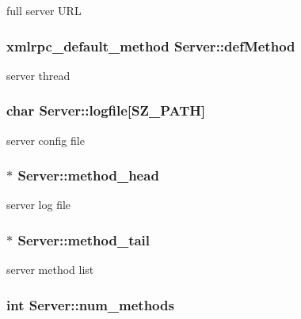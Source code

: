 full server URL \hypertarget{structServer_bafe10e20203238b2f957419066955be}{
\subsubsection[{defMethod}]{\setlength{\rightskip}{0pt plus 5cm}xmlrpc\_\-default\_\-method {\bf Server::defMethod}}}
\label{structServer_bafe10e20203238b2f957419066955be}


server thread \hypertarget{structServer_520e88309f2f48106caa1fb6bacd9b3b}{
\subsubsection[{logfile}]{\setlength{\rightskip}{0pt plus 5cm}char {\bf Server::logfile}\mbox{[}SZ\_\-PATH\mbox{]}}}
\label{structServer_520e88309f2f48106caa1fb6bacd9b3b}


server config file \hypertarget{structServer_0d3f35225f9d2bcb9350016948e77ada}{
\subsubsection[{method\_\-head}]{$\ast$ {\bf Server::method\_\-head}}}
\label{structServer_0d3f35225f9d2bcb9350016948e77ada}


server log file \hypertarget{structServer_baf5367f677cc45e2b46d08989a068e4}{
\subsubsection[{method\_\-tail}]{$\ast$ {\bf Server::method\_\-tail}}}
\label{structServer_baf5367f677cc45e2b46d08989a068e4}


server method list \hypertarget{structServer_fd95ab28088415ee5900bd6bf70dc0a2}{
\subsubsection[{num\_\-methods}]{\setlength{\rightskip}{0pt plus 5cm}int {\bf Server::num\_\-methods}}}
\label{structServer_fd95ab28088415ee5900bd6bf70dc0a2}


